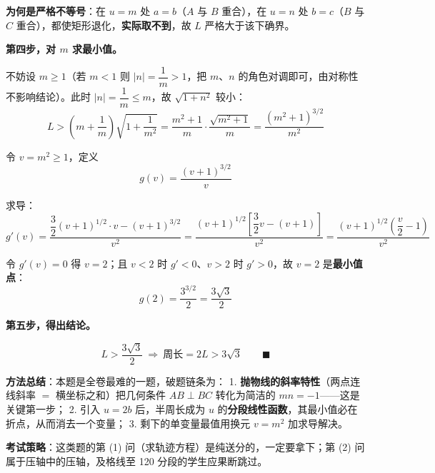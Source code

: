 \textbf{为何是严格不等号}：在 $u=m$ 处 $a=b$（$A$ 与 $B$ 重合），在 $u=n$ 处 $b=c$（$B$ 与 $C$ 重合），都使矩形退化，\textbf{实际取不到}，故 $L$ 严格大于该下确界。

\textbf{第四步，对 $m$ 求最小值。}

不妨设 $m\ge1$（若 $m<1$ 则 $|n|=\dfrac1m>1$，把 $m$、$n$ 的角色对调即可，由对称性不影响结论）。此时 $|n|=\dfrac1m\le m$，故 $\sqrt{1+n^{2}}$ 较小：
\[L>\left(m+\frac1m\right)\sqrt{1+\frac1{m^{2}}}=\frac{m^{2}+1}m\cdot\frac{\sqrt{m^{2}+1}}m=\frac{\left(m^{2}+1\right)^{3/2}}{m^{2}}\]

令 $v=m^{2}\ge1$，定义
\[g(v)=\frac{(v+1)^{3/2}}v\]

求导：
\[g'(v)=\frac{\dfrac32(v+1)^{1/2}\cdot v-(v+1)^{3/2}}{v^{2}}=\frac{(v+1)^{1/2}\left[\dfrac32v-(v+1)\right]}{v^{2}}=\frac{(v+1)^{1/2}\left(\dfrac v2-1\right)}{v^{2}}\]

令 $g'(v)=0$ 得 $v=2$；且 $v<2$ 时 $g'<0$、$v>2$ 时 $g'>0$，故 $v=2$ 是\textbf{最小值点}：
\[g(2)=\frac{3^{3/2}}2=\frac{3\sqrt3}2\]

\textbf{第五步，得出结论。}

\[L>\frac{3\sqrt3}2\ \Longrightarrow\ \text{周长}=2L>3\sqrt3\qquad\blacksquare\]

\begin{gktip}
\textbf{方法总结}：本题是全卷最难的一题，破题链条为：
1. \textbf{抛物线的斜率特性}（两点连线斜率 $=$ 横坐标之和）把几何条件 $AB\perp BC$ 转化为简洁的 $mn=-1$——这是关键第一步；
2. 引入 $u=2b$ 后，半周长成为 $u$ 的\textbf{分段线性函数}，其最小值必在折点，从而消去一个变量；
3. 剩下的单变量最值用换元 $v=m^{2}$ 加求导解决。

\textbf{考试策略}：这类题的第 (1) 问（求轨迹方程）是纯送分的，一定要拿下；第 (2) 问属于压轴中的压轴，及格线至 120 分段的学生应果断跳过。
\end{gktip}

